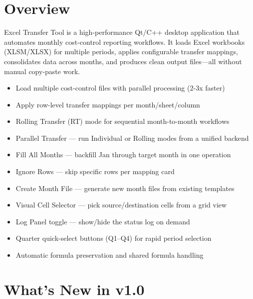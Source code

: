 \documentclass[11pt,a4paper]{article}
\begin{document}
\section{Overview}

Excel Transfer Tool is a high-performance Qt/C++ desktop application that automates monthly cost-control reporting workflows. It loads Excel workbooks (XLSM/XLSX) for multiple periods, applies configurable transfer mappings, consolidates data across months, and produces clean output files---all without manual copy-paste work.

\begin{infobox}
\begin{itemize}[leftmargin=*, itemsep=2pt]
\item Load multiple cost-control files with parallel processing (2-3x faster)
\item Apply row-level transfer mappings per month/sheet/column
\item Rolling Transfer (RT) mode for sequential month-to-month workflows
\item Parallel Transfer --- run Individual or Rolling modes from a unified backend
\item Fill All Months --- backfill Jan through target month in one operation
\item Ignore Rows --- skip specific rows per mapping card
\item Create Month File --- generate new month files from existing templates
\item Visual Cell Selector --- pick source/destination cells from a grid view
\item Log Panel toggle --- show/hide the status log on demand
\item Quarter quick-select buttons (Q1--Q4) for rapid period selection
\item Automatic formula preservation and shared formula handling
\end{itemize}
\end{infobox}

\section{What's New in v1.0}
\end{document}
